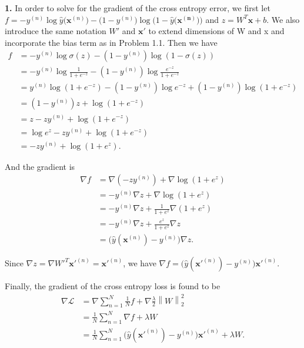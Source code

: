 \documentclass[12pt]{article}
\newcommand{\LL}{\mathcal{L}}
\newcommand{\norm}[1]{\left\lVert#1\right\rVert}
\newenvironment{problem}[2][Problem]{\begin{trivlist}
\item[\hskip \labelsep {\bfseries #1}\hskip \labelsep {\bfseries #2.}]}{\end{trivlist}}
\begin{document}
\begin{problem}{2}

\textbf{1.} In order to solve for the gradient of the cross entropy error, we first let \newline
$f = -y^{(n)}\log \hat{y}\big(\mathbf{x}^{(n)}\big) - \big(1-y^{(n)}\big)\log\big(1-\hat{y}\big(\mathbf{x^{(n)}}\big)\big)$ and $z = W^T\mathbf{x} + b$.
We also introduce the same notation $W'$ and $\mathbf{x'}$ to extend dimensions of W and x and incorporate the bias term as in Problem 1.1.
Then we have
\begin{align*}
f &= -y^{(n)} \log\sigma(z) - (1-y^{(n)}) \log(1-\sigma(z)) \\
&= -y^{(n)} \log \frac{1}{1+e^{-z}} - (1-y^{(n)}) \log \frac{e^{-z}}{1+e^{-z}} \\
&= y^{(n)}\log(1+e^{-z}) - (1-y^{(n)})\log e^{-z} + (1-y^{(n)}) \log(1+e^{-z}) \\
&= (1-y^{(n)})z + \log(1+e^{-z}) \\
&= z - zy^{(n)} + \log(1+e^{-z}) \\
&= \log e^z - zy^{(n)} + \log(1+e^{-z}) \\
&= -zy^{(n)} + \log(1+e^z).
\end{align*}

And the gradient is 
\begin{align*}
\nabla f &= \nabla(-zy^{(n)}) + \nabla \log(1+e^z) \\
&= -y^{(n)} \nabla z + \nabla \log(1+e^z) \\
&= -y^{(n)} \nabla z + \frac{1}{1+e^z} \nabla(1+e^z) \\
&= -y^{(n)} \nabla z + \frac{e^z}{1+e^z}\nabla z \\
&= \big(\hat{y}(\mathbf{x}^{(n)}) - y^{(n)}\big) \nabla z.
\end{align*}

Since $\nabla z = \nabla W'^T\mathbf{x'}^{(n)} = \mathbf{x'}^{(n)}$, we have $\nabla f = \big(\hat{y}(\mathbf{x'}^{(n)}) - y^{(n)}\big) \mathbf{x'}^{(n)}$.

\bigskip
Finally, the gradient of the cross entropy loss is found to be
\begin{align*}
\nabla \LL &= \nabla \sum_{n=1}^N \frac{1}{N}f + \nabla\frac{\lambda}{2}\norm{W}_2^2 \\
&= \frac{1}{N}\sum_{n=1}^N \nabla f + \lambda W \\
&= \frac{1}{N}\sum_{n=1}^N \big(\hat{y}(\mathbf{x'}^{(n)}) - y^{(n)}\big) \mathbf{x'}^{(n)} + \lambda W.
\end{align*}


\end{problem}
\end{document}
